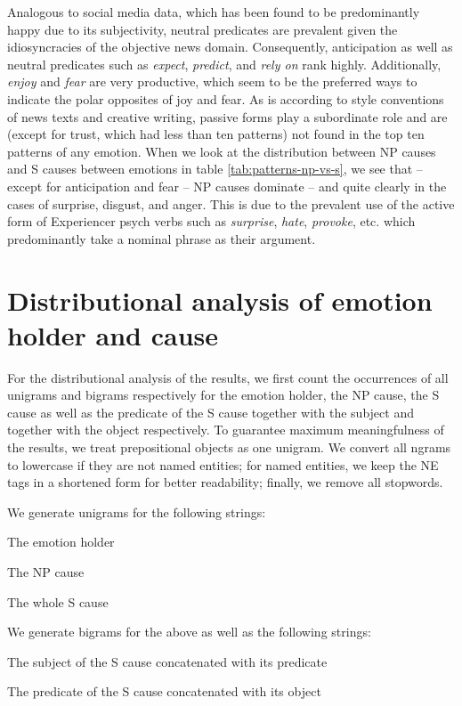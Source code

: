 Analogous to social media data, which has been found to be predominantly happy \cite{depechemood} due to its subjectivity, neutral predicates are prevalent given the idiosyncracies of the objective news domain. Consequently, anticipation as well as neutral predicates such as \textit{expect}, \textit{predict}, and \textit{rely on} rank highly. Additionally, \textit{enjoy} and \textit{fear} are very productive, which seem to be the preferred ways to indicate the polar opposites of joy and fear. As is according to style conventions of news texts and creative writing, passive forms play a subordinate role and are (except for trust, which had less than ten patterns) not found in the top ten patterns of any emotion. When we look at the distribution between NP causes and S causes between emotions in table \ref{tab:patterns-np-vs-s}, we see that -- except for anticipation and fear -- NP causes dominate -- and quite clearly in the cases of surprise, disgust, and anger. This is due to the prevalent use of the active form of Experiencer psych verbs such as \textit{surprise}, \textit{hate}, \textit{provoke}, etc. which predominantly take a nominal phrase as their argument.
	
\section{Distributional analysis of emotion holder and cause}

For the distributional analysis of the results, we first count the occurrences of all unigrams and bigrams respectively for the emotion holder, the NP cause, the S cause as well as the predicate of the S cause together with the subject and together with the object respectively. To guarantee maximum meaningfulness of the results, we treat prepositional objects as one unigram. We convert all ngrams to lowercase if they are not named entities; for named entities, we keep the NE tags in a shortened form for better readability; finally, we remove all stopwords.

We generate unigrams for the following strings:
\begin{aenumerate}
	\item The emotion holder
	\item The NP cause
	\item The whole S cause
\end{aenumerate}

We generate bigrams for the above as well as the following strings:
\begin{aenumerate}
	\item The subject of the S cause concatenated with its predicate
	\item The predicate of the S cause concatenated with its object
\end{aenumerate}

